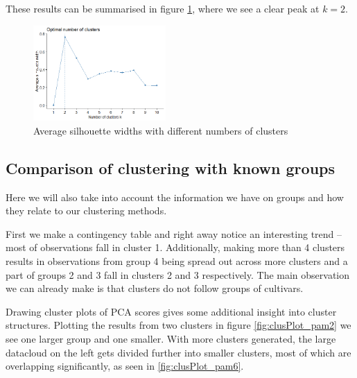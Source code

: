 \documentclass[12pt]{article}
\begin{document}
These results can be summarised in figure \ref{fig:optNumber}, where we see a clear peak at $k=2.$
\begin{figure}
  \begin{center}
    \includegraphics[width = 0.45\textwidth]{../images/project2/number_of_clusters.png}
    \caption{Average silhouette widths with different numbers of clusters}
    \label{fig:optNumber}
  \end{center}
\end{figure}

\subsection{Comparison of clustering with known groups}

Here we will also take into account the information we have on groups and how they relate to our clustering methods. 

First we make a contingency table and right away notice an interesting trend -- most of observations fall in cluster 1. Additionally, making
more than 4 clusters results in observations from group 4 being spread out across more clusters and a part of groups 2 and 3 fall in clusters 2 and 3 respectively.
The main observation we can already make is that clusters do not follow groups of cultivars.

Drawing cluster plots of PCA scores gives some additional insight into cluster structures. Plotting the results from two clusters in figure \ref{fig:clusPlot_pam2}
we see one larger group and one smaller. With more clusters generated, the large datacloud on the left gets divided further into smaller clusters, most of which are overlapping significantly, as seen in
\ref{fig:clusPlot_pam6}.
\end{document}
